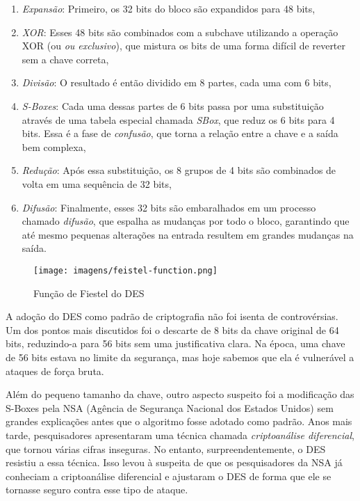\begin{enumerate}
    \item {\em Expansão}: Primeiro, os 32 bits do bloco são expandidos para 48 bits,
    \item {\em XOR}: Esses 48 bits são combinados com a subchave utilizando a operação XOR (ou \textit{ou exclusivo}), que mistura os bits de uma forma difícil de reverter sem a chave correta,
    \item {\em Divisão}: O resultado é então dividido em 8 partes, cada uma com 6 bits,
    \item {\em S-Boxes}: Cada uma dessas partes de 6 bits passa por uma substituição através de uma tabela especial chamada \textit{SBox}, que reduz os 6 bits para 4 bits.
      Essa é a fase de \textit{confusão}, que torna a relação entre a chave e a saída bem complexa,
    \item {\em Redução}: Após essa substituição, os 8 grupos de 4 bits são combinados de volta em uma sequência de 32 bits,
    \item {\em Difusão}: Finalmente, esses 32 bits são embaralhados em um processo chamado \textit{difusão}, que espalha as mudanças por todo o bloco, garantindo que até mesmo pequenas alterações na entrada resultem em grandes mudanças na saída.
\end{enumerate}


\begin{figure}[!htp]
  \centering
  \texttt{[image: imagens/feistel-function.png]}
  \caption{Função de Fiestel do DES}
  \label{fig:feistel-function}
\end{figure}

A adoção do DES como padrão de criptografia não foi isenta de controvérsias.
Um dos pontos mais discutidos foi o descarte de 8 bits da chave original de 64 bits, reduzindo-a para 56 bits sem uma justificativa clara.
Na época, uma chave de 56 bits estava no limite da segurança, mas hoje sabemos que ela é vulnerável a ataques de força bruta.

Além do pequeno tamanho da chave, outro aspecto suspeito foi a modificação das S-Boxes pela NSA (Agência de Segurança Nacional dos Estados Unidos) sem grandes explicações antes que o algoritmo fosse adotado como padrão.
Anos mais tarde, pesquisadores apresentaram uma técnica chamada {\em criptoanálise diferencial}, que tornou várias cifras inseguras.
No entanto, surpreendentemente, o DES resistiu a essa técnica.
Isso levou à suspeita de que os pesquisadores da NSA já conheciam a criptoanálise diferencial e ajustaram o DES de forma que ele se tornasse seguro contra esse tipo de ataque.


